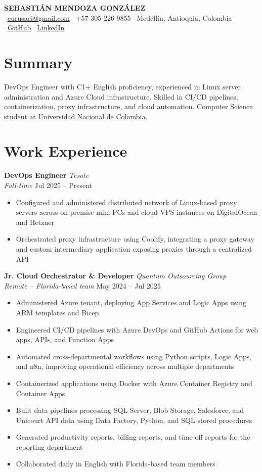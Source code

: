 \documentclass[11pt,a4paper]{article}
\newcommand{\resumeheader}[6]{%
    \begin{center}
        {\Huge\bfseries\color{darktext} #1}\\[8pt]
        {\color{lighttext}
            \faEnvelope\ \href{mailto:#2}{#2} \quad
            \faPhone\ #3 \quad
            \faMapMarker*\ #4
        }\\[4pt]
        {\color{lighttext}
            \faGithub\ \href{#5}{GitHub} \quad
            \faLinkedin\ \href{#6}{LinkedIn}
        }
    \end{center}
    \vspace{4pt}
}
\newcommand{\experienceitem}[4]{%
    \needspace{5\baselineskip}
    \noindent
    \textbf{\color{darktext}#1} \hfill \textit{#2}\\
    \textit{\color{lighttext}#3} \hfill {\color{lighttext}#4}
    \vspace{4pt}
}
\begin{document}
\resumeheader
    {SEBASTI\'{A}N MENDOZA GONZ\'{A}LEZ}
    {eurusaci@gmail.com}
    {+57 305 226 9855}
    {Medell\'{i}n, Antioquia, Colombia}
    {https://github.com/GonzMenSeb}
    {https://www.linkedin.com/in/sebmendozagonzalez/}

\section{Summary}
DevOps Engineer with C1+ English proficiency, experienced in Linux server administration and Azure Cloud infrastructure.
Skilled in CI/CD pipelines, containerization, proxy infrastructure, and cloud automation.
Computer Science student at Universidad Nacional de Colombia.

\section{Work Experience}

\experienceitem
    {DevOps Engineer}
    {Tesote}
    {Full-time}
    {Jul 2025 -- Present}

\begin{itemize}
    \item Configured and administered distributed network of Linux-based proxy servers across on-premise mini-PCs and cloud VPS instances on DigitalOcean and Hetzner
    \item Orchestrated proxy infrastructure using Coolify, integrating a proxy gateway and custom intermediary application exposing proxies through a centralized API
\end{itemize}

\vspace{6pt}

\experienceitem
    {Jr. Cloud Orchestrator \& Developer}
    {Quantum Outsourcing Group}
    {Remote -- Florida-based team}
    {May 2024 -- Jul 2025}

\begin{itemize}
    \item Administered Azure tenant, deploying App Services and Logic Apps using ARM templates and Bicep
    \item Engineered CI/CD pipelines with Azure DevOps and GitHub Actions for web apps, APIs, and Function Apps
    \item Automated cross-departmental workflows using Python scripts, Logic Apps, and n8n, improving operational efficiency across multiple departments
    \item Containerized applications using Docker with Azure Container Registry and Container Apps
    \item Built data pipelines processing SQL Server, Blob Storage, Salesforce, and Unicourt API data using Data Factory, Python, and SQL stored procedures
    \item Generated productivity reports, billing reports, and time-off reports for the reporting department
    \item Collaborated daily in English with Florida-based team members
\end{itemize}
\end{document}
